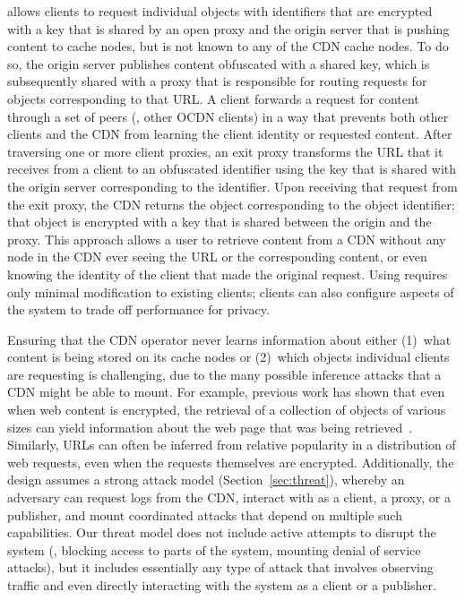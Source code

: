 \system{} allows clients to request individual objects with identifiers that
are encrypted with a key that is shared by an open proxy and the origin server
that is pushing content to cache nodes, but is not known to any of the CDN
cache nodes.  To do so, the origin server publishes content obfuscated with a
shared key, which is subsequently shared with a proxy that is responsible for
routing requests for objects corresponding to that URL.  A client forwards a
request for content through a set of peers (\ie, other OCDN clients) in a way
that prevents both other clients  and the CDN from learning the client
identity or requested content.  After traversing one or more client
proxies, an exit proxy transforms the URL that it receives from a client to an
obfuscated identifier using the key that is shared with the origin server
corresponding to the identifier.  Upon receiving that request from the exit
proxy, the CDN returns the object corresponding to the object identifier; that
object is encrypted with a key that is shared between the origin and the
proxy. This approach allows a user to retrieve content from a CDN without
any node in the CDN ever seeing the URL or the corresponding content, or even knowing
the identity of the client that made the original request. Using \system{} requires
only minimal modification to existing clients; clients can also configure aspects
of the system to trade off performance for privacy.

Ensuring that the CDN operator never learns information about either (1)~what
content is being stored on its cache nodes or (2)~which objects individual
clients are requesting is challenging, due to the many possible inference
attacks that a CDN might be able to mount. For example, previous work has
shown that even when web content is encrypted, the retrieval of a collection
of objects of various sizes can yield information about the web page that was
being retrieved~\cite{panchenko2016website, cai2012touching}. Similarly, URLs
can often be inferred from relative popularity in a distribution of web
requests, even when the requests themselves are encrypted. Additionally, the
\system{} design assumes a strong attack model (Section~\ref{sec:threat}),
whereby an adversary can request logs from the CDN, interact with \system{} as
a client, a proxy, or a publisher, and mount coordinated attacks that depend on
multiple such capabilities. Our threat model does not include active attempts
to disrupt the system (\eg, blocking access to parts of the system, mounting
denial of service attacks), but it includes essentially any type of attack
that involves observing traffic and even directly interacting with the system
as a client or a publisher.

